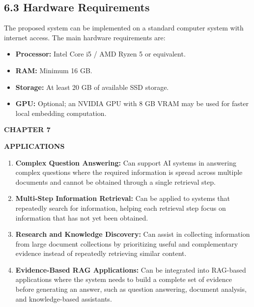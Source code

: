 \documentclass[12pt,a4paper]{report}
\newcommand{\chaptertitle}[2]{
    \begin{center}
        {\fontsize{18}{21}\selectfont\bfseries CHAPTER #1\par}
        \vspace{0.10in}
        {\fontsize{18}{21}\selectfont\bfseries #2\par}
    \end{center}
    \vspace{0.12in}
}
\begin{document}
\subsection*{6.3 Hardware Requirements}

The proposed system can be implemented on a standard computer system
with internet access. The main hardware requirements are:

\begin{itemize}[leftmargin=0.30in,itemsep=0.08in]
\item \textbf{Processor:} Intel Core i5 / AMD Ryzen 5 or equivalent.
\item \textbf{RAM:} Minimum 16 GB.
\item \textbf{Storage:} At least 20 GB of available SSD storage.
\item \textbf{GPU:} Optional; an NVIDIA GPU with 8 GB VRAM may be used
for faster local embedding computation.
\end{itemize}
\label{ch:6:end}

\clearpage

\chaptertitle{7}{APPLICATIONS}
\label{ch:7}

\begin{enumerate}[leftmargin=0.30in,itemsep=0.12in]

\item
\textbf{Complex Question Answering:} Can support AI systems in answering complex questions where the required information is spread across multiple documents and cannot be obtained through a single retrieval step.

\item
\textbf{Multi-Step Information Retrieval:} Can be applied to systems that repeatedly search for information, helping each retrieval step focus on information that has not yet been obtained.

\item
\textbf{Research and Knowledge Discovery:} Can assist in collecting information from large document collections by prioritizing useful and complementary evidence instead of repeatedly retrieving similar content.

\item
\textbf{Evidence-Based RAG Applications:} Can be integrated into RAG-based applications where the system needs to build a complete set of evidence before generating an answer, such as question answering, document analysis, and knowledge-based assistants.

\end{enumerate}
\clearpage
\end{document}
